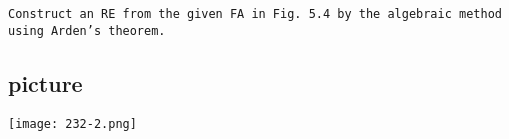 \documentclass[9pt]{article}
\begin{document}
\vspace*{0.2cm}
\hspace*{0.1cm} \texttt{\small{Construct an RE from the given FA in Fig. 5.4 by the algebraic method using Arden’s theorem.}} \\

\vspace*{0.1cm}
\begin{center}
\section{picture}
\texttt{[image: 232-2.png]}
\end{center}
\end{document}
